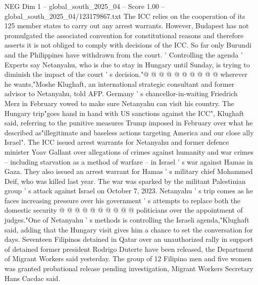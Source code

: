 \begin{textsample}{NEG Dim 1 – global\_south\_2025\_04 – Score 1.00 – global\_south\_2025\_04/123179867.txt}
The ICC relies on the cooperation of its 125 member states to carry out any arrest warrants.
However, Budapest has not promulgated the associated convention for constitutional reasons and therefore asserts it is not obliged to comply with decisions of the ICC.
So far only Burundi and the Philippines have withdrawn from the court. ' Controlling the agenda ' Experts say Netanyahu, who is due to stay in Hungary until Sunday, is trying to diminish the impact of the court ' s decision."@ @ @ @ @ @ @ @ @ @ wherever he wants,"Moshe Klughaft, an international strategic consultant and former advisor to Netanyahu, told AFP.
Germany ' s chancellor-in-waiting Friedrich Merz in February vowed to make sure Netanyahu can visit his country.
The Hungary trip"goes hand in hand with US sanctions against the ICC", Klughaft said, referring to the punitive measures Trump imposed in February over what he described as"illegitimate and baseless actions targeting America and our close ally Israel".
The ICC issued arrest warrants for Netanyahu and former defence minister Yoav Gallant over allegations of crimes against humanity and war crimes -- including starvation as a method of warfare -- in Israel ' s war against Hamas in Gaza.
They also issued an arrest warrant for Hamas ' s military chief Mohammed Deif, who was killed last year.
The war was sparked by the militant Palestinian group ' s attack against Israel on October 7, 2023.
Netanyahu ' s trip comes as he faces increasing pressure over his government ' s attempts to replace both the domestic security @ @ @ @ @ @ @ @ @ @ politicians over the appointment of judges."One of Netanyahu ' s methods is controlling the Israeli agenda,"Klughaft said, adding that the Hungary visit gives him a chance to set the conversation for days.
Seventeen Filipinos detained in Qatar over an unauthorized rally in support of detained former president Rodrigo Duterte have been released, the Department of Migrant Workers said yesterday.
The group of 12 Filipino men and five women was granted probational release pending investigation, Migrant Workers Secretary Hans Cacdac said.

\end{textsample}
